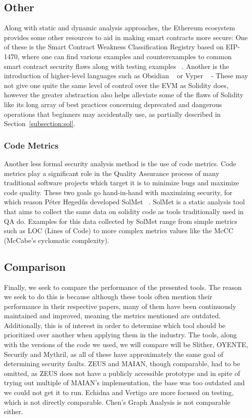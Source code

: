 \documentclass[letterpaper,twocolumn,10pt]{article}
\begin{document}
\subsection{Other}
Along with static and dynamic analysis approaches, the Ethereum ecosystem provides some other resources to aid in making smart contracts more secure: One of these is the Smart Contract Weakness Classification Registry based on EIP-1470, where one can find various examples and counterexamples to common smart contract security flaws along with testing examples ~\cite{SWC}. Another is the introduction of higher-level languages such as Obsidian ~\cite{7965268} or Vyper ~\cite{9223278} - These may not give one quite the same level of control over the EVM as Solidity does, however the greater abstraction also helps alleviate some of the flaws of Solidity like its long array of best practices concerning deprecated and dangerous operations that beginners may accidentally use, as partially described in Section~\ref{subsection:sol}.

\subsubsection{Code Metrics}
Another less formal security analysis method is the use of code metrics. Code metrics play a significant role in the Quality Assurance process of many traditional software projects which target it is to minimize bugs and maximize code quality. These two goals go hand-in-hand with maximizing security, for which reason Péter Hegedűs developed SolMet ~\cite{hegedűs_2019}. SolMet is a static analysis tool that aims to collect the same data on solidity code as tools traditionally used in QA do. Examples for this data collected by SolMet range from simple metrics such as LOC (Lines of Code) to more complex metrics values like the McCC (McCabe’s cyclomatic complexity).

\subsection{Comparison}
Finally, we seek to compare the performance of the presented tools. The reason we seek to do this is because although these tools often mention their performance in their respective papers, many of them have been continuously maintained and improved, meaning the metrics mentioned are outdated. Additionally, this is of interest in order to determine which tool should be prioritized over another when applying them in the industry. The tools, along with the versions of the code we used, we will compare will be Slither\cite{slither}, OYENTE\cite{oyente}, Securify\cite{securify} and Mythril\cite{mythril}, as all of these have approximately the same goal of determining security faults. ZEUS and MAIAN, though comparable, had to be omitted, as ZEUS does not have a publicly accessible prototype and in spite of trying out multiple of MAIAN's implementation, the base was too outdated and we could not get it to run.
Echidna and Vertigo are more focused on testing, which is not directly comparable. Chen's Graph Analysis is not comparable either. 
\end{document}
